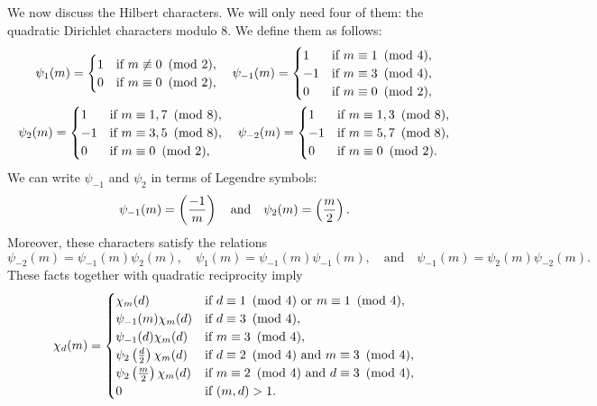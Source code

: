 \documentclass[12pt,reqno,oneside]{amsart}
\begin{document}
    We now discuss the Hilbert characters. We will only need four of them: the quadratic Dirichlet characters modulo $8$. We define them as follows:
    \begin{gather*}
        \psi_{1}(m) = \begin{cases} 1 &\text{if $m \not\equiv 0 \ \left(\text{mod }2\right)$}, \\ 0 &\text{if $m \equiv 0 \ \left(\text{mod }2\right)$}, \end{cases} \quad \psi_{-1}(m) = \begin{cases} 1 &\text{if $m \equiv 1 \ \left(\text{mod }4\right)$}, \\ -1 &\text{if $m \equiv 3 \ \left(\text{mod }4\right)$}, \\ 0 &\text{if $m \equiv 0 \ \left(\text{mod }2\right)$}, \end{cases} \\ \psi_{2}(m) = \begin{cases} 1 &\text{if $m \equiv 1,7 \ \left(\text{mod }8\right)$}, \\ -1 &\text{if $m \equiv 3,5 \ \left(\text{mod }8\right)$}, \\ 0 &\text{if $m \equiv 0 \ \left(\text{mod }2\right)$}, \end{cases} \quad \psi_{-2}(m) = \begin{cases} 1 &\text{if $m \equiv 1,3 \ \left(\text{mod }8\right)$}, \\ -1 &\text{if $m \equiv 5,7 \ \left(\text{mod }8\right)$}, \\ 0 &\text{if $m \equiv 0 \ \left(\text{mod }2\right)$}. \end{cases}
    \end{gather*}
    We can write $\psi_{-1}$ and $\psi_{2}$ in terms of Legendre symbols:
    \[
        \psi_{-1}(m) = \left(\frac{-1}{m}\right) \quad \text{and} \quad \psi_{2}(m) = \left(\frac{m}{2}\right).
    \]
    Moreover, these characters satisfy the relations
    \[
        \psi_{-2}(m) = \psi_{-1}(m)\psi_{2}(m), \quad \psi_{1}(m) = \psi_{-1}(m)\psi_{-1}(m), \quad \text{and} \quad \psi_{-1}(m) = \psi_{2}(m)\psi_{-2}(m).
    \]
    These facts together with quadratic reciprocity imply
    \[
        \chi_{d}(m) = \begin{cases} \chi_{m}(d) & \text{if $d \equiv 1 \ \left(\text{mod }4\right)$ or $m \equiv 1 \ \left(\text{mod }4\right)$}, \\ \psi_{-1}(m)\chi_{m}(d) & \text{if $d \equiv 3 \ \left(\text{mod }4\right)$}, \\ \psi_{-1}(d)\chi_{m}(d) & \text{if $m \equiv 3 \ \left(\text{mod }4\right)$}, \\ \psi_{2}\left(\frac{d}{2}\right)\chi_{m}(d) & \text{if $d \equiv 2 \ \left(\text{mod }4\right)$ and $m \equiv 3 \ \left(\text{mod }4\right)$}, \\ \psi_{2}\left(\frac{m}{2}\right)\chi_{m}(d) & \text{if $m \equiv 2 \ \left(\text{mod }4\right)$ and $d \equiv 3 \ \left(\text{mod }4\right)$}, \\ 0 & \text{if $(m,d) > 1$}. \end{cases}
    \]
\end{document}
